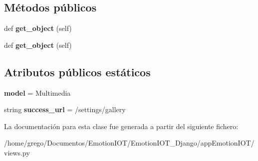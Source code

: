 \subsection*{Métodos públicos}
\begin{DoxyCompactItemize}
\item 
def {\bfseries get\+\_\+object} (self)\hypertarget{classappEmotionIOT_1_1views_1_1Multimedia__delete_ab7b60d8ab523362cb87bbef30198b72f}{}\label{classappEmotionIOT_1_1views_1_1Multimedia__delete_ab7b60d8ab523362cb87bbef30198b72f}

\item 
def {\bfseries get\+\_\+object} (self)\hypertarget{classappEmotionIOT_1_1views_1_1Multimedia__delete_ab7b60d8ab523362cb87bbef30198b72f}{}\label{classappEmotionIOT_1_1views_1_1Multimedia__delete_ab7b60d8ab523362cb87bbef30198b72f}

\end{DoxyCompactItemize}
\subsection*{Atributos públicos estáticos}
\begin{DoxyCompactItemize}
\item 
{\bfseries model} = Multimedia\hypertarget{classappEmotionIOT_1_1views_1_1Multimedia__delete_af35a563c648742777cd12e148bfd0e76}{}\label{classappEmotionIOT_1_1views_1_1Multimedia__delete_af35a563c648742777cd12e148bfd0e76}

\item 
string {\bfseries success\+\_\+url} = \textquotesingle{}/settings/gallery\textquotesingle{}\hypertarget{classappEmotionIOT_1_1views_1_1Multimedia__delete_a6529e830f86a3f87e0eeca5914c72f94}{}\label{classappEmotionIOT_1_1views_1_1Multimedia__delete_a6529e830f86a3f87e0eeca5914c72f94}

\end{DoxyCompactItemize}


La documentación para esta clase fue generada a partir del siguiente fichero\+:\begin{DoxyCompactItemize}
\item 
/home/grego/\+Documentos/\+Emotion\+I\+O\+T/\+Emotion\+I\+O\+T\+\_\+\+Django/app\+Emotion\+I\+O\+T/views.\+py\end{DoxyCompactItemize}
